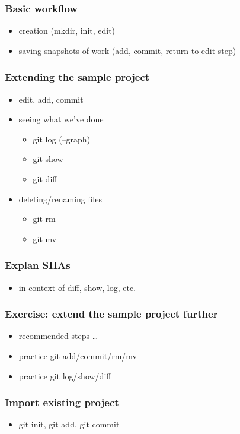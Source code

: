 \documentclass{git_course}
\begin{document}
\begin{frame}
\frametitle{Basic workflow}
\begin{itemize}
    \item creation (mkdir, init, edit)
    \item saving snapshots of work (add, commit, return to edit step)
\end{itemize}
\end{frame}

\begin{frame}
\frametitle{Extending the sample project}
\begin{itemize}
    \item edit, add, commit
    \item seeing what we've done
    \begin{itemize}
        \item git log (--graph)
        \item git show
        \item git diff
    \end{itemize}
    \item deleting/renaming files
    \begin{itemize}
        \item git rm
        \item git mv
    \end{itemize}
\end{itemize}
\end{frame}

\begin{frame}
\frametitle{Explan SHAs}
\begin{itemize}
    \item in context of diff, show, log, etc.
\end{itemize}
\end{frame}

\begin{frame}
\frametitle{Exercise: extend the sample project further}
\begin{itemize}
    \item recommended steps \ldots
    \item practice git add/commit/rm/mv
    \item practice git log/show/diff
\end{itemize}
\end{frame}

\begin{frame}
\frametitle{Import existing project}
\begin{itemize}
    \item git init, git add, git commit
\end{itemize}
\end{frame}
\end{document}
